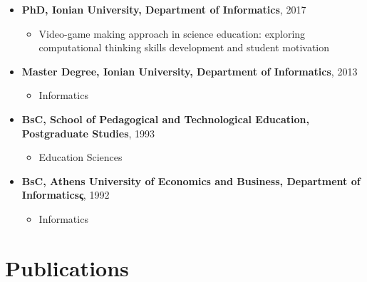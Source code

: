 \documentclass[%
    11pt,
  oneside
  ]{memoir}
\let\oldsection\section
\renewcommand{\section}[1]{%
  \oldsection{#1}
  \leavevmode
  \par
  \vspace{\dimexpr-\baselineskip-\parskip}
}
\begin{document}
\begin{itemize}
\tightlist
\item
  \textbf{PhD, Ionian University, Department of Informatics}, 2017

  \begin{itemize}
  \tightlist
  \item
    Video-game making approach in science education: exploring
    computational thinking skills development and student motivation
  \end{itemize}
\item
  \textbf{Master Degree, Ionian University, Department of Informatics},
  2013

  \begin{itemize}
  \tightlist
  \item
    Informatics
  \end{itemize}
\item
  \textbf{BsC, School of Pedagogical and Technological Education,
  Postgraduate Studies}, 1993

  \begin{itemize}
  \tightlist
  \item
    Education Sciences
  \end{itemize}
\item
  \textbf{BsC, Athens University of Economics and Business, Department
  of Informaticsς}, 1992

  \begin{itemize}
  \tightlist
  \item
    Informatics
  \end{itemize}
\end{itemize}

\hypertarget{publications}{%
\section{Publications}\label{publications}}
\end{document}
